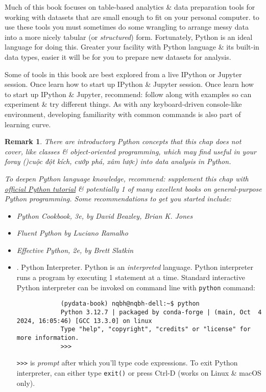 \documentclass{article}
\newtheorem{remark}{Remark}
\begin{document}
\begin{itemize}
	Much of this book focuses on table-based analytics \& data preparation tools for working with datasets that are small enough to fit on your personal computer. to use these tools you must sometimes do some wrangling to arrange messy data into a more nicely tabular (or {\it structured}) form. Fortunately, Python is an ideal language for doing this. Greater your facility with Python language \& its built-in data types, easier it will be for you to prepare new datasets for analysis.
	
	Some of tools in this book are best explored from a live IPython or Jupyter session. Once learn how to start up IPython \& Jupyter session. Once learn how to start up IPython \& Jupyter, recommend: follow along with examples so can experiment \& try different things. As with any keyboard-driven console-like environment, developing familiarity with common commands is also part of learning curve.		
	\begin{remark}
		There are introductory Python concepts that this chap does not cover, like classes \& object-oriented programming, which may find useful in your foray ()cuộc đột kích, cướp phá, xâm lược) into data analysis in Python.
		
		To deepen Python language knowledge, recommend: supplement this chap with \href{http://docs.python.org}{official Python tutorial} \& potentially 1 of many excellent books on general-purpose Python programming. Some recommendations to get you started include:
		\begin{itemize}
			\item {\it Python Cookbook}, 3e, by {\sc David Beazley, Brian K. Jones}
			\item {\it Fluent Python} by {\sc Luciano Ramalho}
			\item {\it Effective Python}, 2e, by {\sc Brett Slatkin}
		\end{itemize}
	\end{remark}
	
	\begin{itemize}
		\item {. Python Interpreter.} Python is an {\it interpreted} language. Python interpreter runs a program by executing 1 statement at a time. Standard interactive Python interpreter can be invoked on command line with {\tt python} command:
		\begin{verbatim}
			(pydata-book) nqbh@nqbh-dell:~$ python
			Python 3.12.7 | packaged by conda-forge | (main, Oct  4 2024, 16:05:46) [GCC 13.3.0] on linux                                                        
			Type "help", "copyright", "credits" or "license" for more information.            
			>>>
		\end{verbatim}
		{\tt>>>} is {\it prompt} after which you'll type code expressions. To exit Python interpreter, can either type {\tt exit()} or press Ctrl-D (works on Linux \& macOS only).
		

\end{itemize}
\end{itemize}
\end{document}
